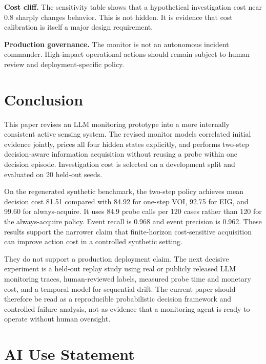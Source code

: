 \documentclass{article}
\begin{document}
\textbf{Cost cliff.} The sensitivity table shows that a hypothetical investigation cost near 0.8 sharply changes behavior. This is not hidden. It is evidence that cost calibration is itself a major design requirement.

\textbf{Production governance.} The monitor is not an autonomous incident commander. High-impact operational actions should remain subject to human review and deployment-specific policy.

\section{Conclusion}

This paper revises an LLM monitoring prototype into a more internally consistent active sensing system. The revised monitor models correlated initial evidence jointly, prices all four hidden states explicitly, and performs two-step decision-aware information acquisition without reusing a probe within one decision episode. Investigation cost is selected on a development split and evaluated on 20 held-out seeds.

On the regenerated synthetic benchmark, the two-step policy achieves mean decision cost 81.51 compared with 84.92 for one-step VOI, 92.75 for EIG, and 99.60 for always-acquire. It uses 84.9 probe calls per 120 cases rather than 120 for the always-acquire policy. Event recall is 0.968 and event precision is 0.962. These results support the narrower claim that finite-horizon cost-sensitive acquisition can improve action cost in a controlled synthetic setting.

They do not support a production deployment claim. The next decisive experiment is a held-out replay study using real or publicly released LLM monitoring traces, human-reviewed labels, measured probe time and monetary cost, and a temporal model for sequential drift. The current paper should therefore be read as a reproducible probabilistic decision framework and controlled failure analysis, not as evidence that a monitoring agent is ready to operate without human oversight.

\section*{AI Use Statement}
\end{document}
